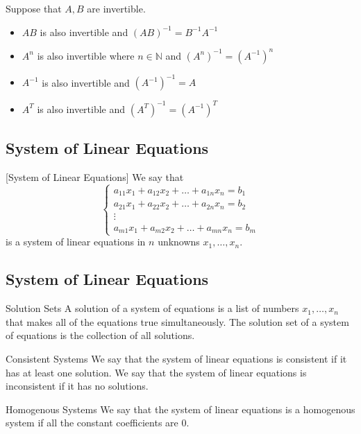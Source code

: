 \documentclass[a4paper]{article}
\begin{document}
\begin{thm}{}{} Suppose that $A,B$ are invertible. 
\begin{itemize}
\item $AB$ is also invertible and $(AB)^{-1}=B^{-1}A^{-1}$
\item $A^n$ is also invertible where $n\in\mathbb{N}$ and $(A^n)^{-1}=(A^{-1})^n$
\item $A^{-1}$ is also invertible and $(A^{-1})^{-1}=A$
\item $A^T$ is also invertible and $(A^T)^{-1}=(A^{-1})^T$
\end{itemize}
\end{thm}

\subsection{System of Linear Equations}
\begin{defn}{}{}[System of Linear Equations] We say that $$
\begin{cases}
a_{11}x_1+a_{12}x_2+\dots+a_{1n}x_n=b_1\\
a_{21}x_1+a_{22}x_2+\dots+a_{2n}x_n=b_2\\
\vdots\\
a_{m1}x_1+a_{m2}x_2+\dots+a_{mn}x_n=b_m
\end{cases}$$ is a system of linear equations in $n$ unknowns $x_1,\dots,x_n$. 
\end{defn}

\subsection{System of Linear Equations}
\begin{defn}{}Solution Sets{} A solution of a system of equations is a list of numbers $x_1,\dots,x_n$ that makes all of the equations true simultaneously. The solution set of a system of equations is the collection of all solutions. 
\end{defn}

\begin{defn}{Consistent Systems}{} We say that the system of linear equations is consistent if it has at least one solution. We say that the system of linear equations is inconsistent if it has no solutions. 
\end{defn}

\begin{defn}{Homogenous Systems}{} We say that the system of linear equations is a homogenous system if all the constant coefficients are $0$. 
\end{defn}
\end{document}
